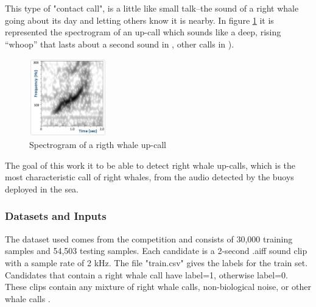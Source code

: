 \documentclass[]{article}
\begin{document}
This type of "contact call",  is a little like small talk--the sound of a right whale going about its day and letting others know it is nearby. In figure \ref{img:upcall} it is represented the spectrogram of an up-call which sounds like a deep, rising “whoop” that lasts about a second sound in \cite{CornellWeb}, other calls in \cite{CornellWeb2}).
\begin{figure}[htpb!]
\centering
\includegraphics[width= 0.3\textwidth]{images/sound_upcall_quiet.jpg}
\caption{Spectrogram of a rigth whale up-call \cite{CornellWeb} \label{img:upcall}}
\end{figure}
The goal of this work it to be able to detect right whale up-calls, which is the most characteristic call of right whales, from the audio detected by the buoys deployed in the sea.
\subsubsection{Datasets and Inputs}\label{datasets-and-inputs}

The dataset used comes from the competition and consists of 30,000 training samples and 54,503 testing samples. Each candidate is a 2-second .aiff sound clip with a sample rate of 2 kHz. The file "train.csv" gives the labels for the train set. Candidates that contain a right whale call have label=1, otherwise label=0. These clips contain any mixture of right whale calls, non-biological noise, or other whale calls \cite{CornellWeb, CornellWeb2}. 
\end{document}
